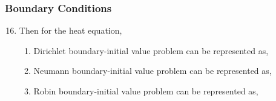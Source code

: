 \documentclass[10pt,compress]{beamer}
\begin{document}
\begin{frame}
 \frametitle{Boundary Conditions} 
 \begin{enumerate}
   \setcounter{enumi}{15}     
   \item <1-> Then for the heat equation, 
      \begin{enumerate}
        \item <2-> Dirichlet boundary-initial value problem can be represented as,
        \item <3-> Neumann boundary-initial value problem can be represented as,
        \item <4-> Robin boundary-initial value problem can be represented as,
  
      \end{enumerate}   
 \end{enumerate}   
 
\end{frame}
\end{document}
